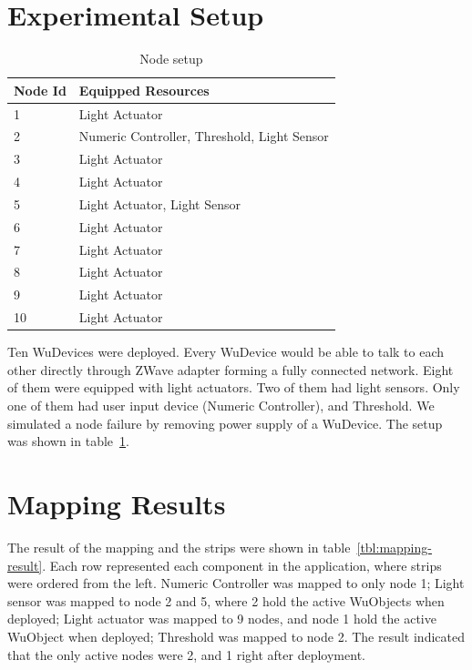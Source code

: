 \section{Experimental Setup}


\begin{table}
\centering
\caption{Node setup}
\label{tbl:setup}
  \begin{tabular}{|l|l|}
  \hline
  \textbf{Node Id} & \textbf{Equipped Resources} \\
  \hline
  1 & Light Actuator \\
  \hline
  2 & Numeric Controller, Threshold, Light Sensor \\
  \hline
  3 & Light Actuator \\
  \hline
  4 & Light Actuator \\
  \hline
  5 & Light Actuator, Light Sensor \\
  \hline
  6 & Light Actuator \\
  \hline
  7 & Light Actuator \\
  \hline
  8 & Light Actuator \\
  \hline
  9 & Light Actuator \\
  \hline
  10 & Light Actuator \\
  \hline
  \end{tabular}
\end{table}

Ten WuDevices were deployed. Every WuDevice would be able to talk to each other
directly through ZWave adapter forming a fully connected network. Eight of them
were equipped with light actuators. Two of them had light sensors. Only one of
them had user input device (Numeric Controller), and Threshold. We simulated
a node failure by removing power supply of a WuDevice. The setup was shown in
table~\ref{tbl:setup}.

\section{Mapping Results}

The result of the mapping and the strips were shown in
table~\ref{tbl:mapping-result}. Each row represented each component in the
application, where strips were ordered from the left. Numeric Controller was
mapped to only node 1; Light sensor was mapped to node 2 and 5, where 2 hold the
active WuObjects when deployed; Light actuator was mapped to 9 nodes, and node
1 hold the active WuObject when deployed; Threshold was mapped to node 2.  The
result indicated that the only active nodes were 2, and 1 right after deployment.

